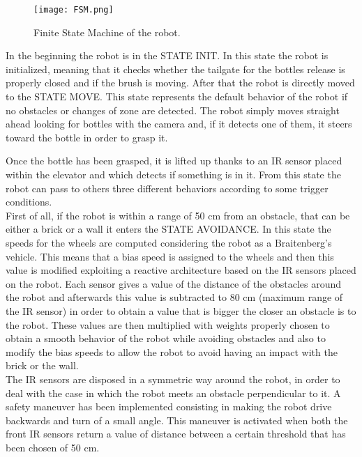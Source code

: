 \begin{figure}
\centering
\texttt{[image: FSM.png]}
\caption{Finite State Machine of the robot.}
\label{fig:FSM}
\end{figure}

In the beginning the robot is in the STATE INIT. In this state the robot is initialized, meaning that it checks whether the tailgate for the bottles release is properly closed and if the brush is moving. After that the robot is directly moved to the STATE MOVE. This state represents the default behavior of the robot if no obstacles or changes of zone are detected. The robot simply moves straight ahead looking for bottles with the camera and, if it detects one of them, it steers toward the bottle in order to grasp it.

Once the bottle has been grasped, it is lifted up thanks to an IR sensor placed within the elevator and which detects if something is in it.
From this state the robot can pass to others three different behaviors according to some trigger conditions.\\

First of all, if the robot is within a range of 50 cm from an obstacle, that can be either a brick or a wall it enters the STATE AVOIDANCE.
In this state the speeds for the wheels are computed considering the robot as a Braitenberg's vehicle. This means that a bias speed is assigned to the wheels and then this value is modified exploiting a reactive architecture based on the IR sensors placed on the robot. Each sensor gives a value of the distance of the obstacles around the robot and afterwards this value is subtracted to 80 cm (maximum range of the IR sensor) in order to obtain a value that is bigger the closer an obstacle is to the robot. These values are then multiplied with weights properly chosen to obtain a smooth behavior of the robot while avoiding obstacles and also to modify the bias speeds to allow the robot to avoid having an impact with the brick or the wall.\\

The IR sensors are disposed in a symmetric way around the robot, in order to deal with the case in which the robot meets an obstacle perpendicular to it. A safety maneuver has been implemented consisting in making the robot drive backwards and turn of a small angle. This maneuver is activated when both the front IR sensors return a value of distance between a certain threshold that has been chosen of 50 cm.\\

